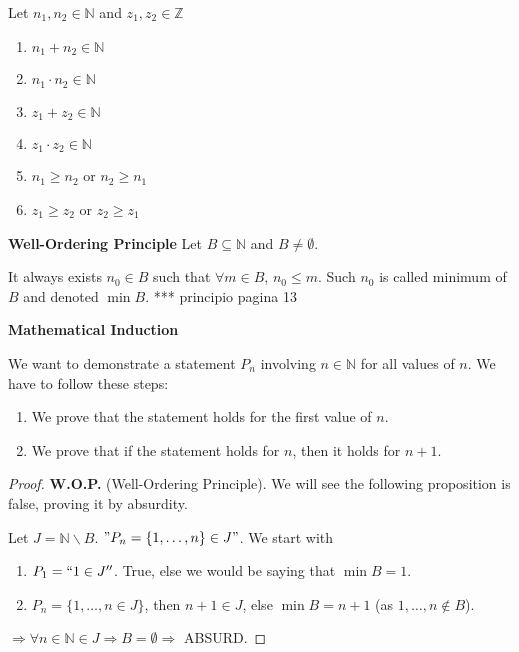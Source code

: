 \documentclass[12pt, a4paper]{book}
\begin{document}
\begin{prop}
  Let $n_1, n_2 \in \mathbb{N}$ and $z_1, z_2 \in \mathbb{Z}$
  \begin{enumerate}[label=\emph{\alph*})]
    \item $n_1 + n_2 \in \mathbb{N}$
    \item $n_1 \cdot n_2 \in \mathbb{N}$
    \item $z_1 + z_2 \in \mathbb{N}$
    \item $z_1 \cdot z_2 \in \mathbb{N}$
    \item $n_1 \geq n_2$ or $n_2 \geq n_1$
    \item $z_1 \geq z_2$ or $z_2 \geq z_1$
  \end{enumerate}
\end{prop}

\begin{prop}
  \textbf{Well-Ordering Principle}
  \boldmath
  Let $B \subseteq \mathbb{N}$ and $B \neq \emptyset$.

  It always exists $n_0 \in B$ such that $\forall m\in B$, $n_0 \leq m$. Such $n_0$ is called minimum of $B$ and denoted $\min B$.
  *** principio pagina 13
  \unboldmath
\end{prop}

\begin{defn}
  \textbf{Mathematical Induction}

  We want to demonstrate a statement $P_n$ involving $n\in\mathbb{N}$ for all values of $n$. We have to follow these steps:
  \begin{enumerate}[label=\emph{\alph*})]
    \item We prove that the statement holds for the first value of $n$.
    \item We prove that if the statement holds for $n$, then it holds for $n+1$.
  \end{enumerate}
\end{defn}

\begin{exmp}
  \begin{proof}
    \textbf{W.O.P.} (Well-Ordering Principle). We will see the following proposition is false, proving it by absurdity.

    Let $J = \mathbb{N} \backslash B$. $"P_n = \{1,\ldots,n\} \in J"$. We start with
    \begin{enumerate}[label=\emph{\alph*})]
      \item $P_1 = ``1 \in J''$. True, else we would be saying that $\min B = 1$.
      \item $P_n = \{1,\ldots,n \in J\}$, then $n+1 \in J$, else $\min B = n+1$ (as $1,\ldots,n \notin B$).
    \end{enumerate}
    $\Rightarrow \forall n\in\mathbb{N}\in J \Rightarrow B = \emptyset \Rightarrow$ ABSURD.
  \end{proof}
\end{exmp}
\end{document}
